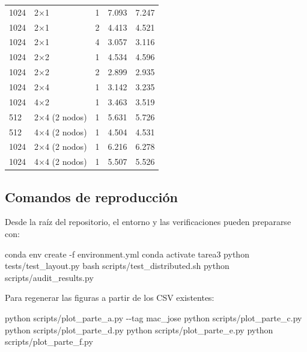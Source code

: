 \documentclass[
  spanish,
  11pt,
  a4paper,
]{article}
\newenvironment{Shaded}{}{}
\newcommand{\AttributeTok}[1]{\textcolor[rgb]{0.49,0.56,0.16}{#1}}
\newcommand{\ExtensionTok}[1]{#1}
\newcommand{\FunctionTok}[1]{\textcolor[rgb]{0.02,0.16,0.49}{#1}}
\newcommand{\NormalTok}[1]{#1}
\begin{document}
{\begin{longtable}[]{@{}lllll@{}}
1024 & 2×1 & 1 & 7.093 & 7.247 \\
1024 & 2×1 & 2 & 4.413 & 4.521 \\
1024 & 2×1 & 4 & 3.057 & 3.116 \\
1024 & 2×2 & 1 & 4.534 & 4.596 \\
1024 & 2×2 & 2 & 2.899 & 2.935 \\
1024 & 2×4 & 1 & 3.142 & 3.235 \\
1024 & 4×2 & 1 & 3.463 & 3.519 \\
512 & 2×4 (2 nodos) & 1 & 5.631 & 5.726 \\
512 & 4×4 (2 nodos) & 1 & 4.504 & 4.531 \\
1024 & 2×4 (2 nodos) & 1 & 6.216 & 6.278 \\
1024 & 4×4 (2 nodos) & 1 & 5.507 & 5.526 \\
\end{longtable}
}

\subsection{Comandos de reproducción}\label{comandos-de-reproducciuxf3n}

Desde la raíz del repositorio, el entorno y las verificaciones pueden
prepararse con:

\begin{samepage}

\begin{Shaded}
\begin{Highlighting}[]
\ExtensionTok{conda}\NormalTok{ env create }\AttributeTok{{-}f}\NormalTok{ environment.yml}
\ExtensionTok{conda}\NormalTok{ activate tarea3}
\ExtensionTok{python}\NormalTok{ tests/test\_layout.py}
\FunctionTok{bash}\NormalTok{ scripts/test\_distributed.sh}
\ExtensionTok{python}\NormalTok{ scripts/audit\_results.py}
\end{Highlighting}
\end{Shaded}

\end{samepage}

Para regenerar las figuras a partir de los CSV existentes:

\begin{samepage}

\begin{Shaded}
\begin{Highlighting}[]
\ExtensionTok{python}\NormalTok{ scripts/plot\_parte\_a.py }\AttributeTok{{-}{-}tag}\NormalTok{ mac\_jose}
\ExtensionTok{python}\NormalTok{ scripts/plot\_parte\_c.py}
\ExtensionTok{python}\NormalTok{ scripts/plot\_parte\_d.py}
\ExtensionTok{python}\NormalTok{ scripts/plot\_parte\_e.py}
\ExtensionTok{python}\NormalTok{ scripts/plot\_parte\_f.py}
\end{Highlighting}
\end{Shaded}

\end{samepage}
\end{document}

